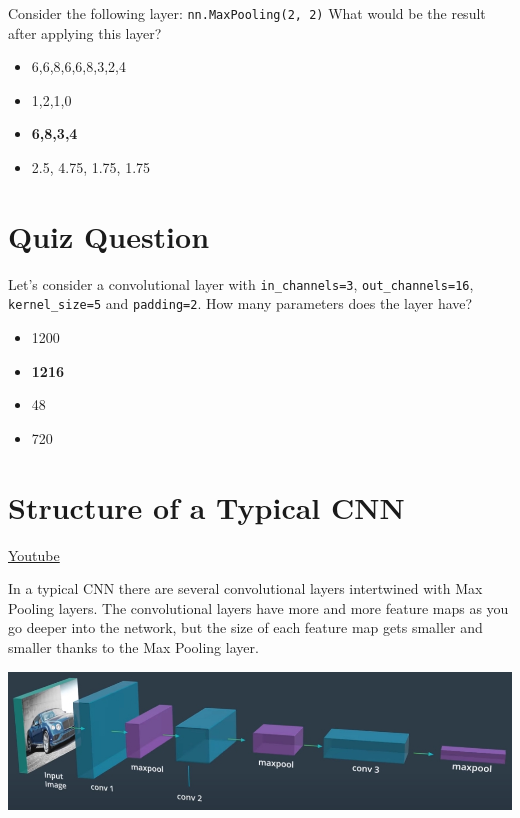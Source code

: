 Consider the following layer: \lstinline{nn.MaxPooling(2, 2)}
What would be the result after applying this layer?

\begin{itemize}
    \item 6,6,8,6,6,8,3,2,4
    \item 1,2,1,0
    \item \textbf{6,8,3,4}
    \item 2.5, 4.75, 1.75, 1.75
\end{itemize}

\section{Quiz Question}

Let's consider a convolutional layer with \lstinline{in_channels=3}, \lstinline{out_channels=16}, \lstinline{kernel_size=5} and \lstinline{padding=2}. How many parameters does the layer have?
\begin{itemize}
    \item 1200
    \item \textbf{1216}
    \item 48
    \item 720
\end{itemize}

\section{Structure of a Typical CNN}
\href{https://www.youtube.com/watch?v=-e4kvl-8y_A&ab_channel=Udacity}{Youtube} \newline

In a typical CNN there are several convolutional layers intertwined with Max Pooling layers. The convolutional layers have more and more feature maps as you go deeper into the network, but the size of each feature map gets smaller and smaller thanks to the Max Pooling layer.

\includegraphics[width=1\linewidth]{img//cnn//depth/cnn-structure.jpeg}

